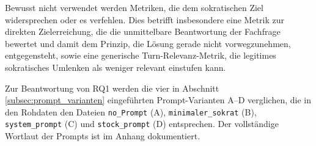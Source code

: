 Bewusst nicht verwendet werden Metriken, die dem sokratischen Ziel widersprechen oder es
verfehlen. Dies betrifft insbesondere eine Metrik zur direkten Zielerreichung, die die
unmittelbare Beantwortung der Fachfrage bewertet und damit dem Prinzip, die Lösung
gerade nicht vorwegzunehmen, entgegensteht, sowie eine generische Turn-Relevanz-Metrik,
die legitimes sokratisches Umlenken als weniger relevant einstufen kann.

Zur Beantwortung von RQ1 werden die vier in Abschnitt \ref{subsec:prompt_varianten} eingeführten Prompt-Varianten A–D verglichen, die in den Rohdaten den Dateien \texttt{no\_Prompt} (A), \texttt{minimaler\_sokrat} (B), \texttt{system\_prompt} (C) und \texttt{stock\_prompt} (D) entsprechen. Der vollständige Wortlaut der Prompts ist im Anhang dokumentiert.

